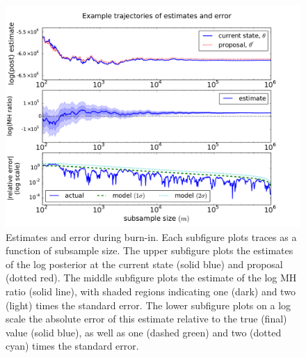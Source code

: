 \documentclass[angelino.tex]{subfiles}
\begin{document}

\begin{figure}[t!]
\begin{center}
\includegraphics[width=\textwidth]{figs/mix-ic-traces-pair.pdf}
\end{center}
\caption{Estimates and error during burn-in.
Each subfigure plots traces as a function of subsample size.
The upper subfigure plots the estimates of the log posterior at
the current state (solid blue) and proposal (dotted red).
The middle subfigure plots the estimate of the log MH ratio (solid line),
with shaded regions indicating one (dark) and two (light) times the standard error.
The lower subfigure plots on a log scale the absolute error of this estimate
relative to the true (final) value (solid blue),
as well as one (dashed green) and two (dotted cyan) times the standard error.
}
\label{fig:pair-ic}
\end{figure}
\end{document}
